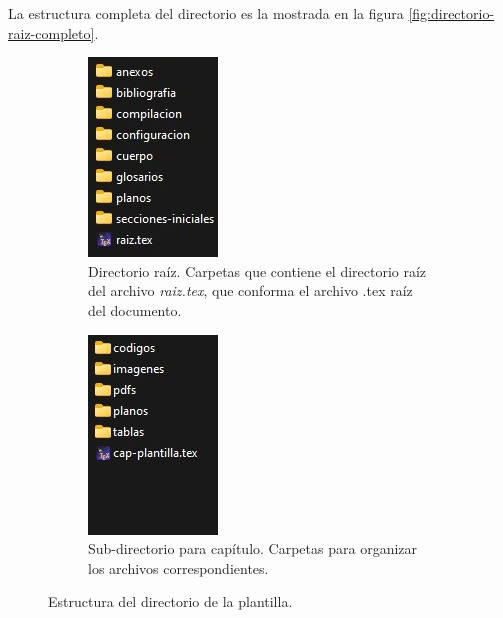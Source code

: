 La estructura completa del directorio es la mostrada en la figura \ref{fig:directorio-raiz-completo}.
%
\begin{figure}
	\centering
	\begin{subfigure}[b]{1\textwidth}
		\centering
		\includegraphics[scale=1]{cuerpo/cap-directorio/imagenes/directorio-raiz}
		\caption[Directorio raíz.]{Directorio raíz. Carpetas que contiene el directorio raíz del archivo \textit{raiz.tex}, que conforma el archivo .tex raíz del documento.}
		\label{subfig:directorio-raiz}
	\end{subfigure}
	\begin{subfigure}[b]{1\textwidth}
		\centering
		\includegraphics[scale=1]{cuerpo/cap-directorio/imagenes/sub.directorio}
		\caption[Sub-directorio para capítulo.]{Sub-directorio para capítulo. Carpetas para organizar los archivos correspondientes.}
		\label{subfig:directorio-cap}
	\end{subfigure}
	\caption{Estructura del directorio de la plantilla.}
	\label{fig:directorios}
\end{figure}
%
